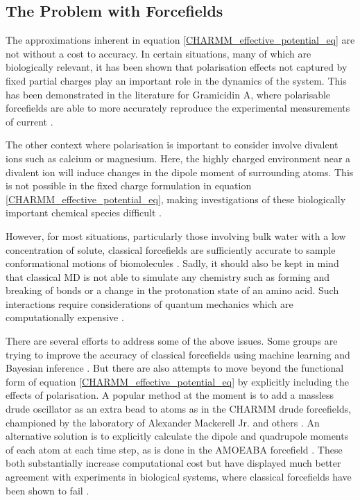 \subsection{The Problem with Forcefields}
The approximations inherent in equation \ref{CHARMM_effective_potential_eq} are not without a cost to accuracy. In certain situations, many of which are biologically relevant, it has been shown that polarisation effects not captured by fixed partial charges play an important role in the dynamics of the system. This has been demonstrated in the literature for Gramicidin A, where polarisable forcefields are able to more accurately reproduce the experimental measurements of current \cite{ngo2021}.

The other context where polarisation is important to consider involve divalent ions such as calcium or magnesium. Here, the highly charged environment near a divalent ion will induce changes in the dipole moment of surrounding atoms. This is not possible in the fixed charge formulation in equation \ref{CHARMM_effective_potential_eq}, making investigations of these biologically important chemical species difficult \cite{mamatkulov2013, bergonzo2016}.

However, for most situations, particularly those involving bulk water with a low concentration of solute, classical forcefields are sufficiently accurate to sample conformational motions of biomolecules \cite{hollingsworth2018}. Sadly, it should also be kept in mind that classical MD is not able to simulate any chemistry such as forming and breaking of bonds or a change in the protonation state of an amino acid. Such interactions require considerations of quantum mechanics which are computationally expensive \cite{melo2018}.

There are several efforts to address some of the above issues. Some groups are trying to improve the accuracy of classical forcefields using machine learning and Bayesian inference \cite{nerenberg2018, unke2021}. But there are also attempts to move beyond the functional form of equation \ref{CHARMM_effective_potential_eq} by explicitly including the effects of polarisation. A popular method at the moment is to add a massless drude oscillator as an extra bead to atoms as in the CHARMM drude forcefields, championed by the laboratory of Alexander Mackerell Jr. and others \cite{lin2020}. An alternative solution is to explicitly calculate the dipole and quadrupole moments of each atom at each time step, as is done in the AMOEABA forcefield \cite{shi2013}. These both substantially increase computational cost but have displayed much better agreement with experiments in biological systems, where classical forcefields have been shown to fail \cite{ngo2021, li2017, shi2013}. 

